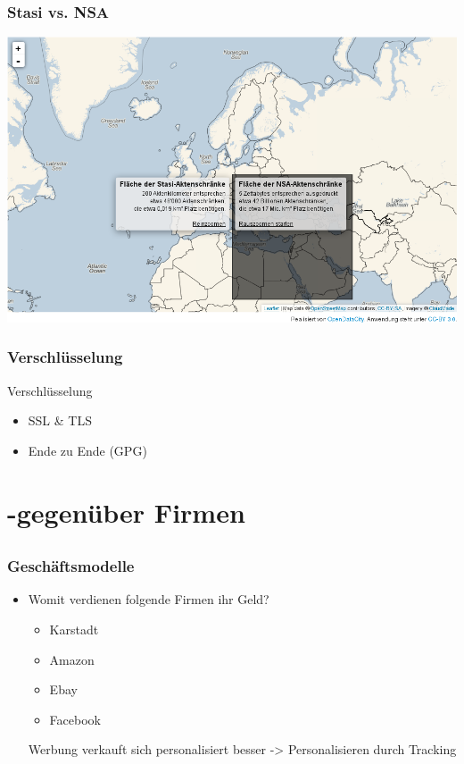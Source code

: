 \documentclass[12pt]{beamer}
\begin{document}
\begin{frame}
\begin{frame}
    \frametitle{Stasi vs. NSA}
    \includegraphics[height=0.7\textheight]{img/akten2.png}
\end{frame}

\begin{frame}
  \frametitle{Verschlüsselung}
  \begin{center} \Large
  Verschlüsselung\\
  \begin{itemize}
  	\item <3-> SSL \& TLS
	\item <3-> Ende zu Ende (GPG)
  \end{itemize}
  \end{center}
\end{frame}

\section{-gegenüber Firmen}
\subsection{}

\begin{frame}
  \frametitle{Geschäftsmodelle}
  \begin{itemize}
    \item Womit verdienen folgende Firmen ihr Geld?
      \begin{itemize}
        \item<2-> Karstadt
        \item<3-> Amazon
        \item<4-> Ebay
        \item<5-> Facebook
      \end{itemize}
       Werbung verkauft sich personalisiert besser -> Personalisieren durch Tracking
  \end{itemize}
\end{frame}


\end{frame}
\end{document}
